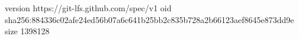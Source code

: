 version https://git-lfs.github.com/spec/v1
oid sha256:884336c02afe24ed56b07a6c641b25bb2c835b728a2b66123aef8645e873dd9e
size 1398128
